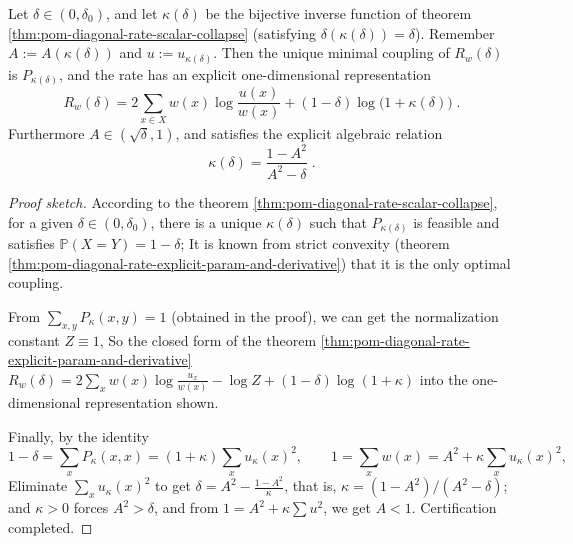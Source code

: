 \begin{corollary}[One-dimensional closed-form rate and algebraic recycling:\texorpdfstring{$\kappa=\frac{1-A^2}{A^2-\delta}$}{kappa=(1-A^2)/(A^2-delta)}]\label{cor:pom-diagonal-rate-scalar-collapse-rate}
Let \(\delta\in(0,\delta_0)\), and let \(\kappa(\delta)\) be the bijective inverse function of theorem \ref{thm:pom-diagonal-rate-scalar-collapse} (satisfying \(\delta(\kappa(\delta))=\delta\)).
Remember \(A:=A(\kappa(\delta))\) and \(u:=u_{\kappa(\delta)}\).
Then the unique minimal coupling of \(R_w(\delta)\) is \(P_{\kappa(\delta)}\), and the rate has an explicit one-dimensional representation
\[
\boxed{\;
R_w(\delta)=2\sum_{x\in X}w(x)\log\frac{u(x)}{w(x)}+(1-\delta)\log\bigl(1+\kappa(\delta)\bigr)\; }.
\]
Furthermore \(A\in(\sqrt\delta,1)\), and satisfies the explicit algebraic relation
\[
\boxed{\;
\kappa(\delta)=\frac{1-A^2}{A^2-\delta}\; } .
\]
\end{corollary}
\begin{proof}[Proof sketch]
According to the theorem \ref{thm:pom-diagonal-rate-scalar-collapse}, for a given \(\delta\in(0,\delta_0)\), there is a unique \(\kappa(\delta)\) such that \(P_{\kappa(\delta)}\) is feasible and satisfies \(\mathbb P(X=Y)=1-\delta\);
It is known from strict convexity (theorem \ref{thm:pom-diagonal-rate-explicit-param-and-derivative}) that it is the only optimal coupling.
\par
From \(\sum_{x,y}P_{\kappa}(x,y)=1\) (obtained in the proof), we can get the normalization constant \(Z\equiv 1\),
So the closed form of the theorem \ref{thm:pom-diagonal-rate-explicit-param-and-derivative}
\(
R_w(\delta)=2\sum_x w(x)\log\frac{u_x}{w(x)}-\log Z+(1-\delta)\log(1+\kappa)
\)
into the one-dimensional representation shown.
\par
Finally, by the identity
\[
1-\delta=\sum_x P_\kappa(x,x)=(1+\kappa)\sum_x u_\kappa(x)^2,
\qquad
1=\sum_x w(x)=A^2+\kappa\sum_x u_\kappa(x)^2,
\]
Eliminate \(\sum_x u_\kappa(x)^2\) to get
\(
\delta=A^2-\frac{1-A^2}{\kappa}
\), that is, \(\kappa=(1-A^2)/(A^2-\delta)\); and \(\kappa>0\) forces \(A^2>\delta\), and from \(1=A^2+\kappa\sum u^2\), we get \(A<1\). Certification completed.
\end{proof}

